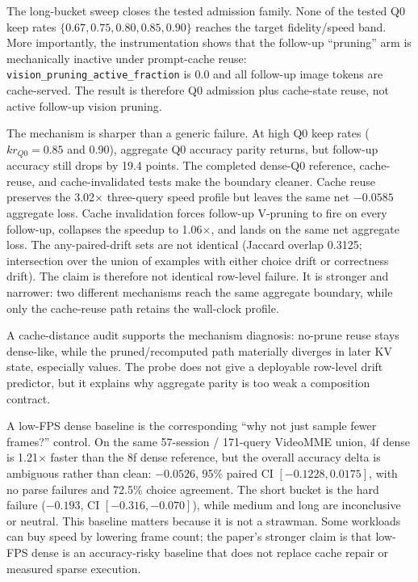 The long-bucket sweep closes the tested admission family. None of the tested
Q0 keep rates \(\{0.67,0.75,0.80,0.85,0.90\}\) reaches the target
fidelity/speed band. More importantly, the instrumentation shows that the follow-up
``pruning'' arm is mechanically inactive under prompt-cache reuse:
\texttt{vision\_pruning\_active\_fraction} is 0.0 and all follow-up image
tokens are cache-served. The result is therefore Q0 admission plus cache-state
reuse, not active follow-up vision pruning.



The mechanism is sharper than a generic failure. At high Q0 keep rates
(\(kr_{Q0}=0.85\) and 0.90), aggregate Q0 accuracy parity returns, but
follow-up accuracy still drops by 19.4 points. The completed dense-Q0 reference,
cache-reuse, and cache-invalidated tests make the boundary cleaner. Cache reuse
preserves the 3.02$\times$ three-query speed profile but leaves the same net
\(-0.0585\) aggregate loss. Cache invalidation forces follow-up V-pruning to
fire on every follow-up, collapses the speedup to 1.06$\times$, and lands on
the same net aggregate loss. The any-paired-drift sets are not identical
(Jaccard overlap 0.3125; intersection over the union of examples with either
choice drift or correctness drift). The claim is therefore not identical
row-level failure. It is stronger and narrower: two different mechanisms reach
the same aggregate boundary, while only the cache-reuse path retains the
wall-clock profile.

A cache-distance audit supports the mechanism diagnosis: no-prune reuse stays
dense-like, while the pruned/recomputed path materially diverges in later KV
state, especially values. The probe does not give a deployable row-level drift
predictor, but it explains why aggregate parity is too weak a composition
contract.

A low-FPS dense baseline is the corresponding ``why not just sample fewer
frames?'' control. On the same 57-session / 171-query VideoMME union, 4f dense
is 1.21$\times$ faster than the 8f dense reference, but the overall accuracy
delta is ambiguous rather than clean: \(-0.0526\), 95\% paired CI
\([-0.1228,0.0175]\), with no parse failures and 72.5\% choice agreement. The
short bucket is the hard failure (\(-0.193\), CI \([-0.316,-0.070]\)), while
medium and long are inconclusive or neutral. This baseline matters because it
is not a strawman. Some workloads can buy speed by lowering frame count; the
paper's stronger claim is that low-FPS dense is an accuracy-risky baseline that
does not replace cache repair or measured sparse execution.

